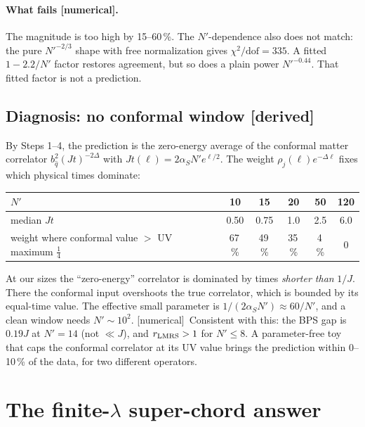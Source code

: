 \documentclass[11pt]{article}
\newcommand{\Np}{N'}
\newcommand{\tagbox}[2]{\textsf{\small\color{#1}[#2]}}
\newcommand{\DER}{\tagbox{cder}{derived}}
\newcommand{\NUM}{\tagbox{cnum}{numerical}}
\theoremstyle{remark}
\begin{document}
\paragraph{What fails \NUM.} The magnitude is too high by 15--60\,\%. The $\Np$-dependence also does not match:
the pure $\Np^{-2/3}$ shape with free normalization gives $\chi^2/\text{dof}=335$. A fitted $1-2.2/\Np$ factor
restores agreement, but so does a plain power $\Np^{-0.44}$. That fitted factor is not a prediction.

\subsection{Diagnosis: no conformal window \DER}
By Steps 1--4, the prediction is the zero-energy average of the conformal matter correlator
$b_{\hat q}^2(Jt)^{-2\Delta}$ with $Jt(\ell)=2\alpha_S\Np e^{\ell/2}$. The weight $\rho_j(\ell)e^{-\Delta\ell}$ fixes
which physical times dominate:

\begin{center}\small
\begin{tabular}{@{}lccccc@{}}\toprule
$\Np$ & 10 & 15 & 20 & 50 & 120\\\midrule
median $Jt$ & 0.50 & 0.75 & 1.0 & 2.5 & 6.0\\
weight where conformal value $>$ UV maximum $\frac14$ & 67\,\% & 49\,\% & 35\,\% & 4\,\% & 0\\\bottomrule
\end{tabular}
\end{center}

At our sizes the ``zero-energy'' correlator is dominated by times \emph{shorter than} $1/J$. There the conformal
input overshoots the true correlator, which is bounded by its equal-time value. The effective small parameter is
$1/(2\alpha_S\Np)\approx60/\Np$, and a clean window needs $\Np\sim10^2$. \NUM\ Consistent with this: the BPS gap is
$0.19J$ at $\Np=14$ (not $\ll J$), and $r_{\rm LMRS}>1$ for $\Np\le8$. A parameter-free toy that caps the conformal
correlator at its UV value brings the prediction within 0--10\,\% of the data, for two different operators.

\section{The finite-$\lambda$ super-chord answer}\label{sec:chord}
\end{document}
